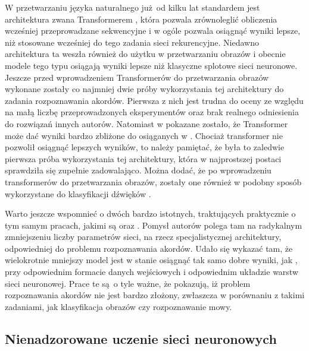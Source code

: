 W przetwarzaniu języka naturalnego już od kilku lat standardem jest architektura zwana Transformerem \cite{vaswani_attention_2017}, która pozwala zrównoleglić obliczenia wcześniej przeprowadzane sekwencyjne i w ogóle pozwala osiągnąć wyniki lepsze, niż stosowane wcześniej do tego zadania sieci rekurencyjne. Niedawno architektura ta weszła również do użytku w przetwarzaniu obrazów \cite{dosovitskiy_image_2021} i obecnie modele tego typu osiągają wyniki lepsze niż klasyczne splotowe sieci neuronowe. Jeszcze przed wprowadzeniem Transformerów do przetwarzania obrazów wykonane zostały co najmniej dwie próby wykorzystania tej architektury do zadania rozpoznawania akordów. Pierwsza z nich \cite{chen_harmony_2019} jest trudna do oceny ze względu na małą liczbę przeprowadzonych eksperymentów oraz brak realnego odniesienia do rozwiązań innych autorów. Natomiast w \cite{park_bi-directional_2019} pokazane zostało, że Transformer może dać wyniki bardzo zbliżone do osiąganych w \cite{korzeniowski_fully_2016}. Chociaż transformer nie pozwolił osiągnąć lepszych wyników, to należy pamiętać, że była to zaledwie pierwsza próba wykorzystania tej architektury, która w najprostszej postaci sprawdziła się zupełnie zadowalająco. Można dodać, że po wprowadzeniu transformerów do przetwarzania obrazów, zostały one również w podobny sposób wykorzystane do klasyfikacji dźwięków \cite{gong_ast_2021}.

Warto jeszcze wspomnieć o dwóch bardzo istotnych, traktujących praktycznie o tym samym pracach, jakimi są \cite{hanlon_fifthnet_2020} oraz \cite{ohanlon_fifthnet_2021}. Pomysł autorów polega tam na radykalnym zmniejszeniu liczby parametrów sieci, na rzecz specjalistycznej architektury, odpowiedniej do problemu rozpoznawania akordów. Udało się wykazać tam, że wielokrotnie mniejszy model jest w stanie osiągnąć tak samo dobre wyniki, jak \cite{korzeniowski_fully_2016}, przy odpowiednim formacie danych wejściowych i odpowiednim układzie warstw sieci neuronowej. Prace te są o tyle ważne, że pokazują, iż problem rozpoznawania akordów nie jest bardzo złożony, zwłaszcza w porównaniu z takimi zadaniami, jak klasyfikacja obrazów czy rozpoznawanie mowy.

\subsection{Nienadzorowane uczenie sieci neuronowych}

